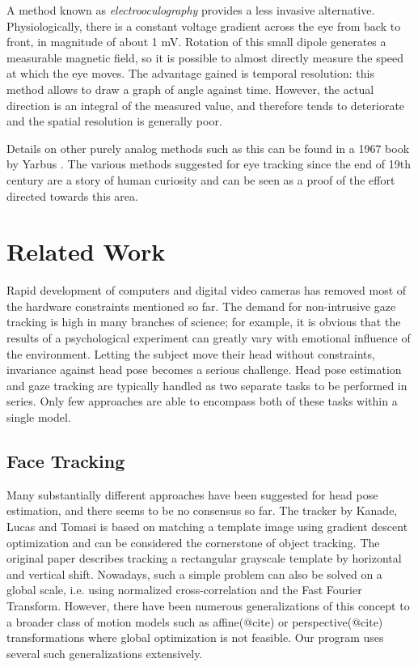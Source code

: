 A method known as \textit{electrooculography} provides a less invasive alternative.
Physiologically, there is a constant voltage gradient across the eye from back to front, in magnitude of about 1 mV.
Rotation of this small dipole generates a measurable magnetic field, so it is possible to almost directly measure the speed at which the eye moves.
The advantage gained is temporal resolution: this method allows to draw a graph of angle against time.
However, the actual direction is an integral of the measured value, and therefore tends to deteriorate and the spatial resolution is generally poor.

Details on other purely analog methods such as this can be found in a 1967 book by Yarbus \cite{b:yarbus67}.
The various methods suggested for eye tracking since the end of 19th century are a story of human curiosity and can be seen as a proof of the effort directed towards this area.

\section{Related Work}

Rapid development of computers and digital video cameras has removed most of the hardware constraints mentioned so far.
The demand for non-intrusive gaze tracking is high in many branches of science; for example, it is obvious that the results of a psychological experiment can greatly vary with emotional influence of the environment.
Letting the subject move their head without constraints, invariance against head pose becomes a serious challenge.
Head pose estimation and gaze tracking are typically handled as two separate tasks to be performed in series.
Only few approaches are able to encompass both of these tasks within a single model.

\subsection{Face Tracking}
Many substantially different approaches have been suggested for head pose estimation, and there seems to be no consensus so far.
The tracker by Kanade, Lucas and Tomasi\cite{b:kanade81} is based on matching a template image using gradient descent optimization and can be considered the cornerstone of object tracking.
The original paper describes tracking a rectangular grayscale template by horizontal and vertical shift.
Nowadays, such a simple problem can also be solved on a global scale, i.e. using normalized cross-correlation and the Fast Fourier Transform.
However, there have been numerous generalizations of this concept to a broader class of motion models such as affine(@cite) or perspective(@cite) transformations where global optimization is not feasible.
Our program uses several such generalizations extensively.

